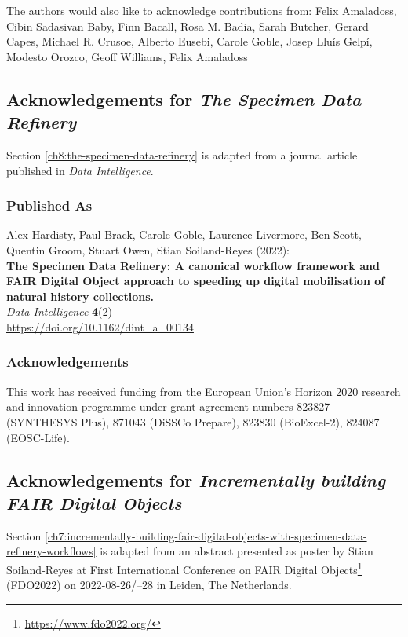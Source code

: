 The authors would also like to acknowledge contributions from: Felix
Amaladoss, Cibin Sadasivan Baby, Finn Bacall, Rosa M. Badia, Sarah
Butcher, Gerard Capes, Michael R. Crusoe, Alberto Eusebi, Carole Goble,
Josep Lluís Gelpí, Modesto Orozco, Geoff Williams, Felix Amaladoss


\subsection{Acknowledgements for \emph{The Specimen Data Refinery}}\label{ch11:refinery}

Section \vref{ch8:the-specimen-data-refinery} is adapted from a journal article published in \emph{Data Intelligence}.

\subsubsection*{Published As}

Alex Hardisty, Paul Brack, Carole Goble, Laurence Livermore, Ben Scott,
Quentin Groom, Stuart Owen, Stian Soiland-Reyes (2022):\\
\textbf{The Specimen Data Refinery: A canonical workflow framework and
FAIR Digital Object approach to speeding up digital mobilisation of
natural history collections.}\\
\emph{Data Intelligence} \textbf{4}(2)\\
\url{https://doi.org/10.1162/dint_a_00134}


\subsubsection*{Acknowledgements}

This work has received funding from the European Union's Horizon 2020
research and innovation programme under grant agreement numbers 823827
(SYNTHESYS Plus), 871043 (DiSSCo Prepare), 823830 (BioExcel-2), 824087
(EOSC-Life).




\subsection{Acknowledgements for \emph{Incrementally building FAIR Digital Objects}}\label{ch11:incrementally-fdo}

Section \vref{ch7:incrementally-building-fair-digital-objects-with-specimen-data-refinery-workflows}  is adapted from an abstract
presented as poster by Stian Soiland-Reyes at 
First International Conference on FAIR Digital Objects\footnote{\url{https://www.fdo2022.org/}}
(FDO2022) on
2022-08-26/--28 in Leiden, The Netherlands. 

